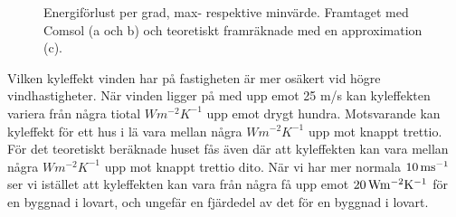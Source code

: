 \begin{figure}[hpbt]
\centering
{}
\vspace{5mm}


\caption{\label{fig:windenergyloss}Energiförlust per grad, max- respektive minvärde.
Framtaget med Comsol (a och b) och teoretiskt framräknade med en approximation (c).}
\end{figure}

Vilken kyleffekt vinden har på fastigheten är mer osäkert vid högre vindhastigheter. När vinden
 ligger på med upp emot 25 m/s kan kyleffekten variera från några tiotal $\unit{W m^{-2} K^{-1}}$ upp 
 emot drygt hundra. Motsvarande kan kyleffekt för ett hus i lä vara mellan några $\unit{W m^{-2} K^{-1}}$ upp mot knappt trettio. För det teoretiskt beräknade huset fås även där att kyleffekten 
 kan vara mellan några $\unit{W m^{-2} K^{-1}}$ upp mot knappt trettio dito. När vi har mer normala $\unit[10]{m s^{-1}}$ ser vi istället att kyleffekten kan vara från några få upp emot $\unit[20]{W m^{-2} K^{-1}}$ för en byggnad i 
 lovart, och ungefär en fjärdedel av det för en byggnad i lovart.
 
